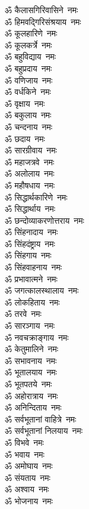 \begin{multicols}{2}
\begin{flushleft}
ॐ कैलासगिरिवासिने~नमः\\
ॐ हिमवद्गिरिसंश्रयाय~नमः\hfill{}\\
ॐ कूलहारिणे~नमः\\
ॐ कूलकर्त्रे~नमः\\
ॐ बहुविद्याय~नमः\\
ॐ बहुप्रदाय~नमः\\
ॐ वणिजाय~नमः\\
ॐ वर्धकिने~नमः\\
ॐ वृक्षाय~नमः\\
ॐ बकुलाय~नमः\\
ॐ चन्दनाय~नमः\\
ॐ छदाय~नमः\hfill{}\\
ॐ सारग्रीवाय~नमः\\
ॐ महाजत्रवे~नमः\\
ॐ अलोलाय~नमः\\
ॐ महौषधाय~नमः\\
ॐ सिद्धार्थकारिणे~नमः\\
ॐ सिद्धार्थाय~नमः\\
ॐ छन्दोव्याकरणोत्तराय~नमः\\
ॐ सिंहनादाय~नमः\\
ॐ सिंहदंष्ट्राय~नमः\\
ॐ सिंहगाय~नमः\hfill{}\\
ॐ सिंहवाहनाय~नमः\\
ॐ प्रभावात्मने~नमः\\
ॐ जगत्कालस्थालाय~नमः\\
ॐ लोकहिताय~नमः\\
ॐ तरवे~नमः\\
ॐ सारञ्गाय~नमः\\
ॐ नवचक्राङ्गाय~नमः\\
ॐ केतुमालिने~नमः\\
ॐ सभावनाय~नमः\\
ॐ भूतालयाय~नमः\hfill{}\\
ॐ भूतपतये~नमः\\
ॐ अहोरात्राय~नमः\\
ॐ अनिन्दिताय~नमः\\
ॐ सर्वभूतानां वाहित्रे~नमः\\
ॐ सर्वभूतानां निलयाय~नमः\\
ॐ विभवे~नमः\\
ॐ भवाय~नमः\\
ॐ अमोघाय~नमः\\
ॐ संयताय~नमः\\
ॐ अश्वाय~नमः\hfill{}\\
ॐ भोजनाय~नमः\\

\end{flushleft}
\end{multicols}
